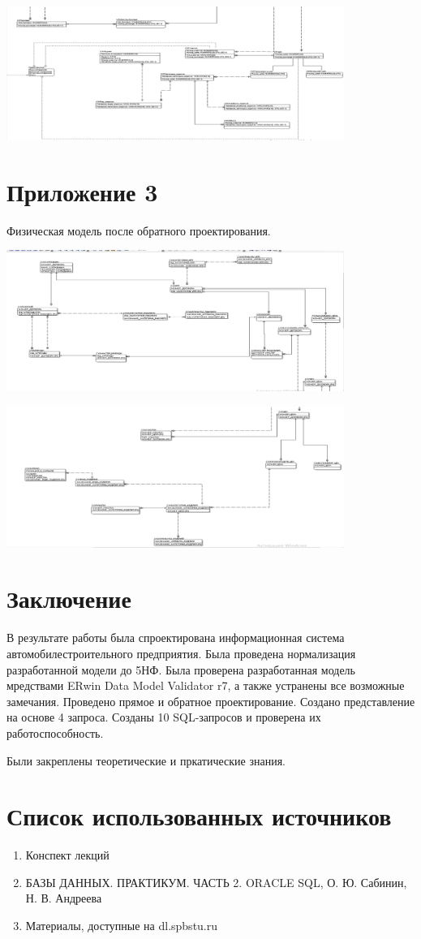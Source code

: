     \includegraphics[width=11cm]{./screenshots/model/physical2.png}

\section{Приложение 3}

    Физическая модель после обратного проектирования.

    \includegraphics[width=11cm]{./screenshots/model/reverse1.png}

    \includegraphics[width=11cm]{./screenshots/model/reverse2.png}

\section{Заключение}
В результате работы была спроектирована информационная система автомобилестроительного предприятия.
Была проведена нормализация разработанной модели до 5НФ.
Была проверена разработанная модель мредствами ERwin Data Model Validator r7, а также устранены все возможные замечания.
Проведено прямое и обратное проектирование.
Создано представление на основе 4 запроса.
Созданы 10 SQL-запросов и проверена их работоспособность.

Были закреплены теоретические и пркатические знания.

\section{Список использованных источников}

\begin{enumerate}

    \item Конспект лекций
    \item БАЗЫ ДАННЫХ. ПРАКТИКУМ. ЧАСТЬ 2. ORACLE SQL, О. Ю. Сабинин, Н. В. Андреева
    \item Материалы, доступные на dl.spbstu.ru

\end{enumerate}


